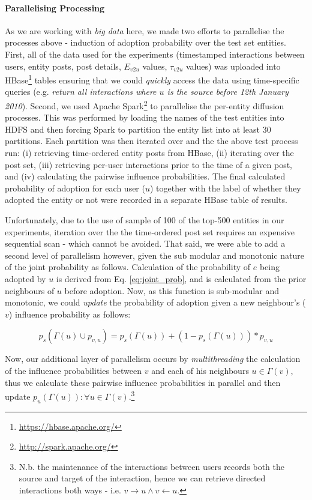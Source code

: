 \documentclass[journal,10pt,draftclsnofoot,onecolumn]{IEEEtran}
\begin{document}
\paragraph{Parallelising Processing}
As we are working with \emph{big data} here, we made two efforts to parallelise the processes above - induction of adoption probability over the test set entities.
First, all of the data used for the experiments (timestamped interactions between users, entity posts, post details, $E_{v2u}$ values, $\tau_{v2u}$ values) was uploaded into HBase\footnote{\url{https://hbase.apache.org/}} tables ensuring that we could \emph{quickly} access the data using time-specific queries (e.g. \emph{return all interactions where $u$ is the source before 12th January 2010}).
Second, we used Apache Spark\footnote{\url{http://spark.apache.org/}} to parallelise the per-entity diffusion processes.
This was performed by loading the names of the test entities into HDFS and then forcing Spark to partition the entity list into at least 30 partitions.
Each partition was then iterated over and the the above test process run: (i) retrieving time-ordered entity posts from HBase, (ii) iterating over the post set, (iii) retrieving per-user interactions prior to the time of a given post, and (iv) calculating the pairwise influence probabilities.
The final calculated probability of adoption for each user ($u$) together with the label of whether they adopted the entity or not were recorded in a separate HBase table of results.

Unfortunately, due to the use of sample of 100 of the top-500 entities in our experiments, iteration over the the time-ordered post set requires an expensive sequential scan - which cannot be avoided.
That said, we were able to add a second level of parallelism however, given the sub modular and monotonic nature of the joint probability as follows.
Calculation of the probability of $e$ being adopted by $u$ is derived from Eq. \ref{eq:joint_prob}, and is calculated from the prior neighbours of $u$ before adoption.
Now, as this function is sub-modular and monotonic, we could \emph{update} the probability of adoption given a new neighbour's ($v$) influence probability as follows:

\begin{equation}
p_s(\Gamma(u) \cup p_{v,u}) = p_s(\Gamma(u)) + (1 - p_s(\Gamma(u))) * p_{v,u}
\end{equation}

Now, our additional layer of parallelism occurs by \emph{multithreading} the calculation of the influence probabilities between $v$ and each of his neighbours $u \in \Gamma(v)$, thus we calculate these pairwise influence probabilities in parallel and then update $p_u(\Gamma(u)) : \forall u \in \Gamma(v)$.\footnote{N.b. the maintenance of the interactions between users records both the source and target of the interaction, hence we can retrieve directed interactions both ways - i.e. $v \rightarrow u \wedge v \leftarrow u$.}
\end{document}
